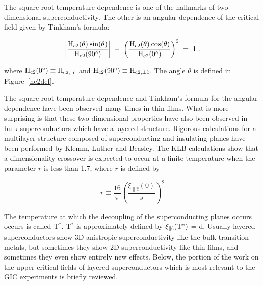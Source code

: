         The square-root temperature dependence is one of the hallmarks of
two-dimensional superconductivity.  The other is an angular dependence of
the critical field given by Tinkham's formula:\cite{tinkham63}

\begin{equation}
\label{tinkham1}
\rm \left| \frac{H_{c2}(\theta) \: sin(\theta)}{H_{c2}(90^{\circ})} \right| \; + \;
\left( \frac{H_{c2}(\theta) \: cos(\theta)}{H_{c2}(0^{\circ})} \right)^2 \;
= \; 1 \; .
\end{equation}

\noindent  where  $\rm H_{c2}(0^{\circ}) \equiv H_{c2, \parallel \hat{c}}$
and  $\rm H_{c2}(90^{\circ})  \equiv    H_{c2, \perp \hat{c}}$.   The angle
$\theta$ is defined in Figure~\ref{hc2def}.

        The  square-root temperature dependence  and Tinkham's  formula for
the angular dependence have been observed many  times in thin  films.  What
is more surprising is that  these two-dimensional properties have also been
observed in bulk superconductors which  have a layered structure.  Rigorous
calculations for a   multilayer structure composed  of  superconducting and
insulating  planes     have   been    performed by  Klemm,      Luther  and
Beasley.\cite{klemm75}  The KLB  calculations   show that  a dimensionality
crossover is expected to  occur at a  finite temperature when the parameter
$r$ is less than 1.7,\cite{klemm75} where $r$ is defined by

\begin{equation}
\label{klbparam1}
r \equiv \frac{16}{\pi} \left( \frac{\xi_{\parallel \hat{c}}(0)}{s}
\right)^2
\end{equation}

\noindent  The temperature at which the decoupling of the superconducting 
planes occurs occurs is  called T$^*$.  T$^*$ is  approximately  defined by
$\rm \xi_{\parallel  \hat{c}}(T^*)$  = d.   Usually layered superconductors
show 3D anistropic superconductivity  like the bulk  transition metals, but
sometimes  they show 2D  superconductivity  like thin films, and  sometimes
they even show entirely new effects.  Below, the portion of the work on the
upper critical fields of layered  superconductors which is most relevant to
the GIC experiments is briefly reviewed.

